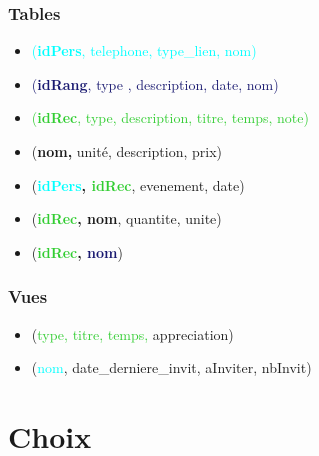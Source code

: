 \documentclass[a4paper,10pt]{report}
\begin{document}
\subsubsection{Tables}

\begin{itemize}
\item \textcolor{cyan}{ (\textbf{idPers}, telephone, type\_lien, nom)} 
\item \textcolor{MidnightBlue}{ (\textbf{idRang}, type , description, date, nom)} 
\item \textcolor{LimeGreen}{ (\textbf{idRec}, type, description, titre, temps, note)} 
\item \textcolor{BrickRed}{ (\textbf{nom,} unité, description, prix)}
\item {} (\textbf{\textcolor{cyan}{idPers}, \textcolor{LimeGreen}{idRec}}, evenement, date) 
\item {} (\textbf{\textcolor{LimeGreen}{idRec}, \textcolor{BrickRed}{nom}}, quantite, unite)
\item {} (\textbf{\textcolor{LimeGreen}{idRec}, \textcolor{MidnightBlue}{nom}})

\end{itemize}

\subsubsection{Vues}
\begin{itemize}
\item {} (\textcolor{LimeGreen}{type, titre, temps,} appreciation)


\item {} (\textcolor{cyan}{nom}, date\_derniere\_invit, aInviter, nbInvit)

    
    
\end{itemize}

\section{Choix}
\end{document}
